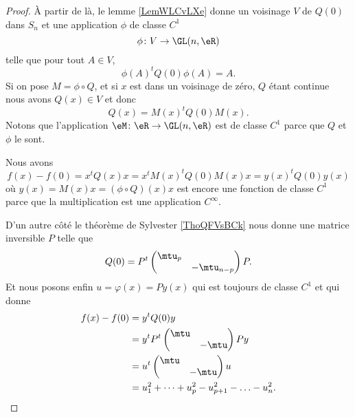 \begin{proof}
    À partir de là, le lemme \ref{LemWLCvLXe} donne un voisinage \( V\) de \( Q(0)\) dans \( S_n\) et une application \( \phi\) de classe \( C^1\)
    \begin{equation}
            \phi\colon V\to \GL(n,\eR) \\
    \end{equation}
    telle que pour tout \( A\in V\),
    \begin{equation}
        \phi(A)^tQ(0)\phi(A)=A.
    \end{equation}
    Si on pose \( M=\phi\circ Q\), et si \( x\) est dans un voisinage de zéro, \( Q\) étant continue nous avons \( Q(x)\in V\) et donc
    \begin{equation}
        Q(x)=M(x)^tQ(0)M(x).
    \end{equation}
    Notons que l'application \( \eM\colon \eR\to \GL(n,\eR)\) est de classe \( C^1\) parce que \( Q\) et \( \phi\) le sont.

    Nous avons
    \begin{equation}
        f(x)-f(0)=x^tQ(x)x=x^tM(x)^tQ(0)M(x)x=y(x)^tQ(0)y(x)
    \end{equation}
    où \( y(x)=M(x)x=(\phi\circ Q)(x)x\) est encore une fonction de classe \( C^1\) parce que la multiplication est une application \(  C^{\infty}\).

    D'un autre côté le théorème de Sylvester \ref{ThoQFVsBCk} nous donne une matrice inversible \( P\) telle que
    \begin{equation}
        Q(0)=P^t\begin{pmatrix}
            \mtu_p    &       \\ 
            &   -\mtu_{n-p}    
        \end{pmatrix}P.
    \end{equation}
    Et nous posons enfin \( u=\varphi(x)=Py(x)\) qui est toujours de classe \( C^1\) et qui donne
    \begin{subequations}
        \begin{align}
            f(x)-f(0)&=y^tQ(0)y\\
            &=y^tP^t\begin{pmatrix}
                \mtu    &       \\ 
                    &   -\mtu    
            \end{pmatrix}Py\\
            &=u^t\begin{pmatrix}
                \mtu    &       \\ 
                    &   -\mtu    
            \end{pmatrix}u\\
            &=u_1^2+\cdots +u_p^2-u_{p+1}^2-\ldots -u_n^2.
        \end{align}
    \end{subequations}
    

\end{proof}
